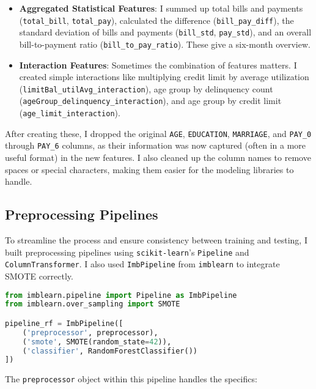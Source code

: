 \documentclass[a4paper,12pt]{article}
\begin{document}
\begin{itemize}
    \item \textbf{Aggregated Statistical Features}: I summed up total bills and payments (\texttt{total\_bill}, \texttt{total\_pay}), calculated the difference (\texttt{bill\_pay\_diff}), the standard deviation of bills and payments (\texttt{bill\_std}, \texttt{pay\_std}), and an overall bill-to-payment ratio (\texttt{bill\_to\_pay\_ratio}). These give a six-month overview.
    
    \item \textbf{Interaction Features}: Sometimes the combination of features matters. I created simple interactions like multiplying credit limit by average utilization (\texttt{limitBal\_utilAvg\_interaction}), age group by delinquency count (\texttt{ageGroup\_delinquency\_interaction}), and age group by credit limit (\texttt{age\_limit\_interaction}).

\end{itemize}

After creating these, I dropped the original \texttt{AGE}, \texttt{EDUCATION}, \texttt{MARRIAGE}, and \texttt{PAY\_0} through \texttt{PAY\_6} columns, as their information was now captured (often in a more useful format) in the new features. I also cleaned up the column names to remove spaces or special characters, making them easier for the modeling libraries to handle. 

\subsection{Preprocessing Pipelines}

To streamline the process and ensure consistency between training and testing, I built preprocessing pipelines using \texttt{scikit-learn}'s \texttt{Pipeline} and \texttt{ColumnTransformer}. I also used \texttt{ImbPipeline} from \texttt{imblearn} to integrate SMOTE correctly.

\begin{lstlisting}[language=Python, caption={Pipeline with SMOTE and classifier}, label={lst:pipeline}]
from imblearn.pipeline import Pipeline as ImbPipeline
from imblearn.over_sampling import SMOTE

pipeline_rf = ImbPipeline([
    ('preprocessor', preprocessor),
    ('smote', SMOTE(random_state=42)),
    ('classifier', RandomForestClassifier())
])
\end{lstlisting}

The \texttt{preprocessor} object within this pipeline handles the specifics:
\end{document}
